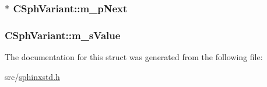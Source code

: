 \hypertarget{structCSphVariant_a01737970e93eded1ef575b6b94264df2}{
\subsubsection[{m\-\_\-p\-Next}]{$\ast$ C\-Sph\-Variant\-::m\-\_\-p\-Next}}\label{structCSphVariant_a01737970e93eded1ef575b6b94264df2}
\hypertarget{structCSphVariant_af9974f67d953c0257675234c22608a29}{
\subsubsection[{m\-\_\-s\-Value}]{ C\-Sph\-Variant\-::m\-\_\-s\-Value\hspace{0.3cm}{\ttfamily [protected]}}}\label{structCSphVariant_af9974f67d953c0257675234c22608a29}


The documentation for this struct was generated from the following file\-:\begin{DoxyCompactItemize}
\item 
src/\hyperlink{sphinxstd_8h}{sphinxstd.\-h}\end{DoxyCompactItemize}

